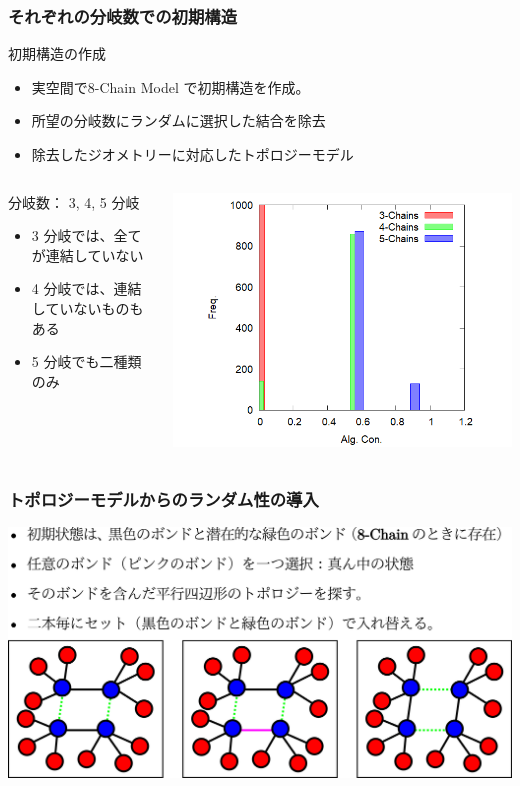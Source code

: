 \documentclass[12pt, dvipdfmx]{beamer}
\begin{document}
\begin{frame}
	\frametitle{それぞれの分岐数での初期構造}
		\begin{exampleblock}{初期構造の作成}
			\begin{itemize}
				\item \alert{実空間}で8-Chain Model で初期構造を作成。
				\item 所望の分岐数に\alert{ランダム}に選択した\alert{結合を除去}
				\item 除去したジオメトリーに対応した\alert{トポロジーモデル}
			\end{itemize}
		\end{exampleblock}
		\begin{columns}[totalwidth=\linewidth]
				\begin{block}{分岐数： 3, 4, 5 分岐}
					\begin{itemize}
						\item 3 分岐では、全てが連結していない
						\item 4 分岐では、連結していないものもある
						\item 5 分岐でも二種類のみ
					\end{itemize}
				\end{block}
				\includegraphics[width=\columnwidth]{Histgram2.png}
		\end{columns}
\end{frame}

\begin{frame}
	\frametitle{トポロジーモデルからのランダム性の導入}
		\includegraphics[width=\textwidth]{bond_exchg.png}
\end{frame}
\end{document}
